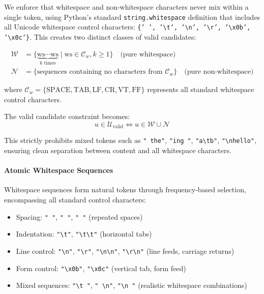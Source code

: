 We enforce that whitespace and non-whitespace characters never mix within a single token, using Python's standard \texttt{string.whitespace} definition that includes all Unicode whitespace control characters: \texttt{\{' ', '\textbackslash t', '\textbackslash n', '\textbackslash r', '\textbackslash x0b', '\textbackslash x0c'\}}. This creates two distinct classes of valid candidates:

\begin{align}
\mathcal{W} &= \{\underbrace{\text{ws} \cdots \text{ws}}_{k \text{ times}} \mid \text{ws} \in \mathcal{C}_w, k \geq 1\} \quad\text{(pure whitespace)} \\
\mathcal{N} &= \{\text{sequences containing no characters from } \mathcal{C}_w\} \quad\text{(pure non-whitespace)}
\end{align}

where $\mathcal{C}_w = \{\text{SPACE}, \text{TAB}, \text{LF}, \text{CR}, \text{VT}, \text{FF}\}$ represents all standard whitespace control characters.

The valid candidate constraint becomes:
\[
u \in \mathcal{U}_{\text{valid}} \iff u \in \mathcal{W} \cup \mathcal{N}
\]

This strictly prohibits mixed tokens such as \texttt{" the"}, \texttt{"ing "}, \texttt{"a\textbackslash tb"}, \texttt{"\textbackslash nhello"}, ensuring clean separation between content and all whitespace characters.

\paragraph{Atomic Whitespace Sequences}

Whitespace sequences form natural tokens through frequency-based selection, encompassing all standard control characters:

\begin{itemize}
    \item Spacing: \texttt{" "}, \texttt{"  "}, \texttt{"    "} (repeated spaces)
    \item Indentation: \texttt{"\textbackslash t"}, \texttt{"\textbackslash t\textbackslash t"} (horizontal tabs)
    \item Line control: \texttt{"\textbackslash n"}, \texttt{"\textbackslash r"}, \texttt{"\textbackslash n\textbackslash n"}, \texttt{"\textbackslash r\textbackslash n"} (line feeds, carriage returns)
    \item Form control: \texttt{"\textbackslash x0b"}, \texttt{"\textbackslash x0c"} (vertical tab, form feed)
    \item Mixed sequences: \texttt{"\textbackslash t "}, \texttt{" \textbackslash n"}, \texttt{"\textbackslash n  "} (realistic whitespace combinations)
\end{itemize}

